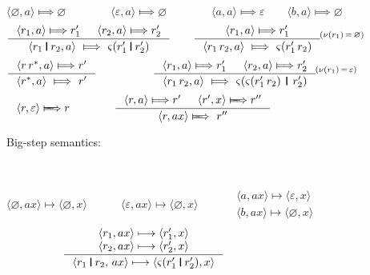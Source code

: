 \begin{figure}\centering
\begin{subfigure}{\textwidth}
\[
\langle\varnothing, a\rangle \Longmapsto \varnothing
\qquad\qquad
\langle\varepsilon, a\rangle \Longmapsto \varnothing
\qquad\qquad
\langle a, a\rangle \Longmapsto \varepsilon
\quad\quad
\langle b, a\rangle \Longmapsto \varnothing
\]
\[
\inference{ \langle r_1, a\rangle \Longmapsto r_1'
          & \langle r_2, a\rangle \Longmapsto r_2' }{
            \langle r_1 \VERT r_2, a\rangle
            ~\Longmapsto~ \varsigma(r_1'\VERT r_2')}
\qquad
\inference{ \langle r_1, a\rangle \Longmapsto r_1' }{
            \langle r_1\,r_2, a\rangle
            ~\Longmapsto~ \varsigma(r_1'\,r_2)}
            \!^{(\nu(r_1)\,=\,\varnothing)}
\]
\[
\inference{
   \langle r\,r^{*}, a\rangle \Longmapsto r' }{
   \langle r^{*}, a\rangle ~\Longmapsto~ r' }
\qquad\qquad\quad
\inference{ \langle r_1, a\rangle \Longmapsto r_1'
          & \langle r_2, a \rangle \Longmapsto r_2' }{
            \langle r_1\,r_2, a\rangle
            ~\Longmapsto~ \varsigma(\varsigma(r_1'\,r_2)\,\VERT\,r_2')}
            \!^{(\nu(r_1)\,=\,\varepsilon)}
\]
\[
\langle r, \varepsilon\rangle \LONGmapsto r
\qquad\qquad
\inference{ \langle r, a\rangle \Longmapsto r'
          & \langle r', x\rangle \LONGmapsto r'' }{
            \langle r, ax\rangle \LONGmapsto~ r''}
\]
\caption{Big-step semantics:\label{sfig:ReDerivBig}
\hspace{2ex} }
\end{subfigure}
~\\
\begin{subfigure}{\textwidth}
\[
\langle \varnothing,ax\rangle \longmapsto \langle \varnothing,x\rangle
\qquad\quad
\langle \varepsilon,ax\rangle \longmapsto \langle \varnothing,x\rangle
\qquad\quad
\begin{array}{ll}
\langle a,ax\rangle \longmapsto \langle \varepsilon,x\rangle \\[.75ex]
\langle b,ax\rangle \longmapsto \langle \varnothing,x\rangle
\end{array}
\]
\[
\inference{ \langle r_1, ax\rangle \longmapsto \langle r_1',x \rangle
         \\ \langle r_2, ax\rangle \longmapsto \langle r_2',x \rangle }{
            \langle r_1 \VERT r_2,\,ax \rangle
            \longmapsto \langle\varsigma(r_1' \VERT r_2'), x \rangle }
\]
\end{subfigure}
\end{figure}
